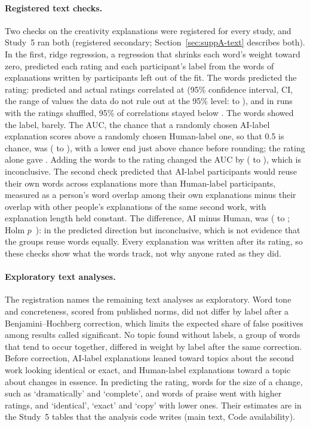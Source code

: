 \paragraph*{Registered text checks.}
Two checks on the creativity explanations were registered for every study, and Study~5 ran both (registered secondary; Section~\ref{sec:suppA-text} describes both). In the first, ridge regression, a regression that shrinks each word's weight toward zero, predicted each rating and each participant's label from the words of explanations written by participants left out of the fit. The words predicted the rating: predicted and actual ratings correlated at \SFiveTextRecRatingCreat{} (95\% confidence interval, CI, the range of values the data do not rule out at the 95\% level: \SFiveTextRecRatingCreatLo{} to \SFiveTextRecRatingCreatHi), and in runs with the ratings shuffled, 95\% of correlations stayed below \SFiveTextRecRatingCreatNull. The words showed the label, barely. The AUC, the chance that a randomly chosen AI-label explanation scores above a randomly chosen Human-label one, so that 0.5 is chance, was \SFiveTextRecArmCreat{} (\SFiveTextRecArmCreatLo{} to \SFiveTextRecArmCreatHi), with a lower end just above chance before rounding; the rating alone gave \SFiveTextRecArmFromRatingCreat. Adding the words to the rating changed the AUC by \SFiveTextRecIncrCreat{} (\SFiveTextRecIncrCreatLo{} to \SFiveTextRecIncrCreatHi), which is inconclusive. The second check predicted that AI-label participants would reuse their own words across explanations more than Human-label participants, measured as a person's word overlap among their own explanations minus their overlap with other people's explanations of the same second work, with explanation length held constant. The difference, AI minus Human, was \SFiveTextOverlapCreatDiff{} (\SFiveTextOverlapCreatLo{} to \SFiveTextOverlapCreatHi; Holm $p$~\SFiveTextOverlapCreatPHolm): in the predicted direction but inconclusive, which is not evidence that the groups reuse words equally. Every explanation was written after its rating, so these checks show what the words track, not why anyone rated as they did.

\paragraph*{Exploratory text analyses.}
The registration names the remaining text analyses as exploratory. Word tone and concreteness, scored from published norms, did not differ by label after a Benjamini--Hochberg correction, which limits the expected share of false positives among results called significant. No topic found without labels, a group of words that tend to occur together, differed in weight by label after the same correction. Before correction, AI-label explanations leaned toward topics about the second work looking identical or exact, and Human-label explanations toward a topic about changes in essence. In predicting the rating, words for the size of a change, such as `dramatically' and `complete', and words of praise went with higher ratings, and `identical', `exact' and `copy' with lower ones. Their estimates are in the Study~5 tables that the analysis code writes (main text, Code availability).

\clearpage
